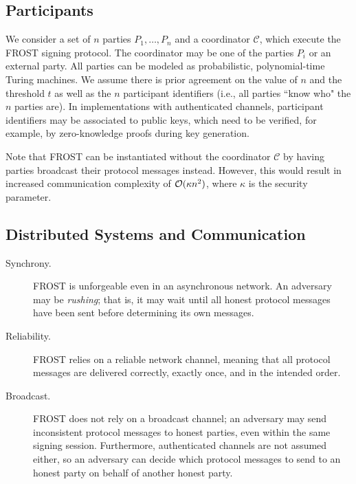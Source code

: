 \subsection{Participants}
We consider a set of $n$ parties
$P_1, \dots, P_n$ and a coordinator $\mathcal{C}$, which execute the FROST signing protocol.
The coordinator may be one of the parties $P_i$ or an external party.
All parties can be modeled as probabilistic, polynomial-time Turing machines.
We assume there is prior agreement on the value of $n$ and the threshold $t$ as well as the $n$ participant identifiers (i.e., all parties ``know who" the $n$ parties are).
In implementations with authenticated channels, participant identifiers may be associated to public keys, which need to be verified, for example, by zero-knowledge proofs during key generation.

Note that FROST can be instantiated without the coordinator $\mathcal{C}$ by having parties broadcast their protocol messages instead.  However, this would result in increased communication complexity of $\mathcal{O}(\kappa n^2)$, where $\kappa$ is the security parameter.

\subsection{Distributed Systems and Communication}

\begin{description}

\item[Synchrony.] FROST is unforgeable even in an asynchronous network. An adversary may be \emph{rushing}; that is, it may wait until all honest protocol messages have been sent before determining its own messages.

\item[Reliability.] FROST relies on a reliable network channel, meaning that all protocol messages are delivered correctly, exactly once, and in the intended order.  

\item[Broadcast.] FROST does not rely on a broadcast channel; an adversary may send inconsistent protocol messages to honest parties, even within the same signing session.  Furthermore, authenticated channels are not assumed either, so an adversary can decide which protocol messages to send to an honest party on behalf of another honest party.

\end{description}

